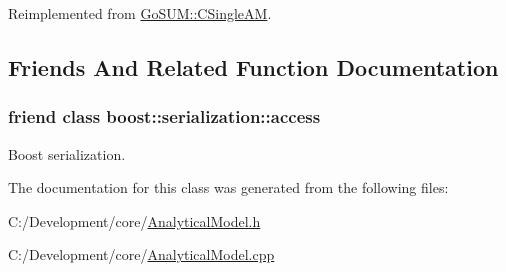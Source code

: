 Reimplemented from \hyperlink{class_go_s_u_m_1_1_c_single_a_m_a761e514fefeb7324e5509571f1be3848}{Go\-S\-U\-M\-::\-C\-Single\-A\-M}.



\subsection{Friends And Related Function Documentation}
\hypertarget{class_go_s_u_m_1_1_c_nu_svr_s_a_m_ac98d07dd8f7b70e16ccb9a01abf56b9c}{
\subsubsection[{boost\-::serialization\-::access}]{\setlength{\rightskip}{0pt plus 5cm}friend class boost\-::serialization\-::access\hspace{0.3cm}{\ttfamily [friend]}}}\label{class_go_s_u_m_1_1_c_nu_svr_s_a_m_ac98d07dd8f7b70e16ccb9a01abf56b9c}


Boost serialization. 



The documentation for this class was generated from the following files\-:\begin{DoxyCompactItemize}
\item 
C\-:/\-Development/core/\hyperlink{_analytical_model_8h}{Analytical\-Model.\-h}\item 
C\-:/\-Development/core/\hyperlink{_analytical_model_8cpp}{Analytical\-Model.\-cpp}\end{DoxyCompactItemize}
